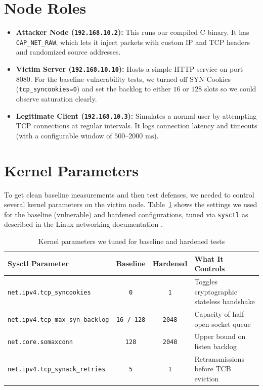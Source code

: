 \documentclass[11pt,a4paper]{report}
\begin{document}
\section{Node Roles}
\begin{itemize}
    \item \textbf{Attacker Node (\texttt{192.168.10.2}):} This runs our compiled C binary. It has \texttt{CAP\_NET\_RAW}, which lets it inject packets with custom IP and TCP headers and randomized source addresses.
    \item \textbf{Victim Server (\texttt{192.168.10.10}):} Hosts a simple HTTP service on port 8080. For the baseline vulnerability tests, we turned off SYN Cookies (\texttt{tcp\_syncookies=0}) and set the backlog to either $16$ or $128$ slots so we could observe saturation clearly.
    \item \textbf{Legitimate Client (\texttt{192.168.10.3}):} Simulates a normal user by attempting TCP connections at regular intervals. It logs connection latency and timeouts (with a configurable window of $500\text{--}2000\text{ ms}$).
\end{itemize}

\section{Kernel Parameters}
To get clean baseline measurements and then test defenses, we needed to control several kernel parameters on the victim node. Table~\ref{tab:sysctl} shows the settings we used for the baseline (vulnerable) and hardened configurations, tuned via \texttt{sysctl} as described in the Linux networking documentation \cite{linux_kernel}.

\begin{table}[H]
    \centering
    \caption{Kernel parameters we tuned for baseline and hardened tests}
    \label{tab:sysctl}
    \begin{tabularx}{\textwidth}{@{}l c c >{\raggedright\arraybackslash}X@{}}
        \toprule
        \textbf{Sysctl Parameter} & \textbf{Baseline} & \textbf{Hardened} & \textbf{What It Controls} \\
        \midrule
        \texttt{net.ipv4.tcp\_syncookies} & \texttt{0} & \texttt{1} & Toggles cryptographic stateless handshake \\
        \texttt{net.ipv4.tcp\_max\_syn\_backlog} & \texttt{16 / 128} & \texttt{2048} & Capacity of half-open socket queue \\
        \texttt{net.core.somaxconn} & \texttt{128} & \texttt{2048} & Upper bound on listen backlog \\
        \texttt{net.ipv4.tcp\_synack\_retries} & \texttt{5} & \texttt{1} & Retransmissions before TCB eviction \\
        \bottomrule
    \end{tabularx}
\end{table}
\end{document}
